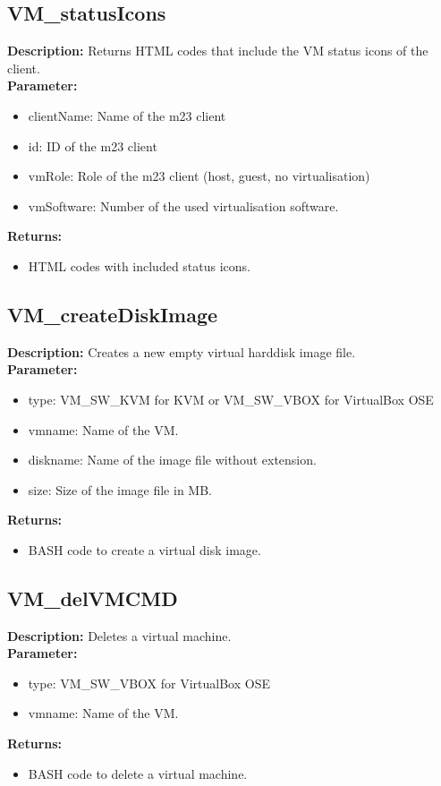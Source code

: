 \subsection{VM\_statusIcons}
\textbf{Description:} Returns HTML codes that include the VM status icons of the client.\\
\textbf{Parameter:}
\begin{itemize}
\item clientName: Name of the m23 client
\item id: ID of the m23 client
\item vmRole: Role of the m23 client (host, guest, no virtualisation)
\item vmSoftware: Number of the used virtualisation software.
\end{itemize}
\textbf{Returns:}
\begin{itemize}
\item HTML codes with included status icons.
\end{itemize}

\subsection{VM\_createDiskImage}
\textbf{Description:} Creates a new empty virtual harddisk image file.\\
\textbf{Parameter:}
\begin{itemize}
\item type: VM\_SW\_KVM for KVM or VM\_SW\_VBOX for VirtualBox OSE
\item vmname: Name of the VM.
\item diskname: Name of the image file without extension.
\item size: Size of the image file in MB.
\end{itemize}
\textbf{Returns:}
\begin{itemize}
\item BASH code to create a virtual disk image.
\end{itemize}

\subsection{VM\_delVMCMD}
\textbf{Description:} Deletes a virtual machine.\\
\textbf{Parameter:}
\begin{itemize}
\item type: VM\_SW\_VBOX for VirtualBox OSE
\item vmname: Name of the VM.
\end{itemize}
\textbf{Returns:}
\begin{itemize}
\item BASH code to delete a virtual machine.
\end{itemize}

